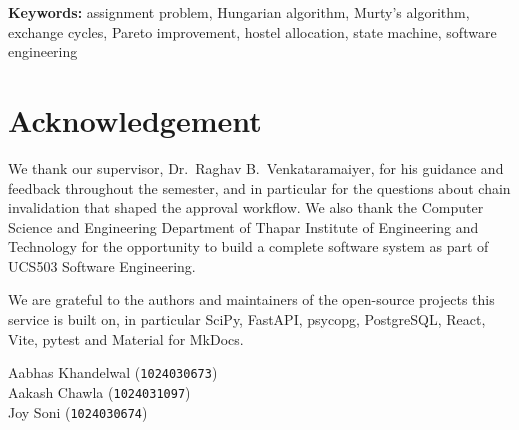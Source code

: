\vspace{1em}
\noindent\textbf{Keywords:} assignment problem, Hungarian algorithm,
Murty's algorithm, exchange cycles, Pareto improvement, hostel
allocation, state machine, software engineering


\chapter*{Acknowledgement}

We thank our supervisor, Dr.\ Raghav B.\ Venkataramaiyer, for his
guidance and feedback throughout the semester, and in particular for the
questions about chain invalidation that shaped the approval workflow.
We also thank the Computer Science and Engineering Department of Thapar
Institute of Engineering and Technology for the opportunity to build a
complete software system as part of UCS503 Software Engineering.

We are grateful to the authors and maintainers of the open-source
projects this service is built on, in particular SciPy, FastAPI,
psycopg, PostgreSQL, React, Vite, pytest and Material for MkDocs.

\vspace{2cm}
\begin{flushright}
Aabhas Khandelwal (\texttt{1024030673}) \\
Aakash Chawla (\texttt{1024031097}) \\
Joy Soni (\texttt{1024030674})
\end{flushright}
